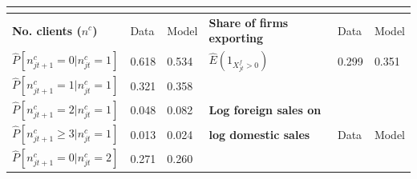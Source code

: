 \bigskip

\begin{table}
    \centering
    {\small 
    \begin{tabular}{llllll}
        \multicolumn{6}{c}{} \\ \hline\hline
        \textbf{No. clients (}$n^{c}$\textbf{)}\footnotemark[0]                                       & {Data}                                         &
        {Model}                                                                       & \textbf{Share of firms exporting}              &
        {Data}                                                                        & {Model} \\ \hline
        $\widehat{P}[n_{jt+1}^{c}=0|n_{jt}^{c}=1]$                                    & {0.618}                                        &
        {0.534}                                                                       & $\widehat{E}(1_{X_{jt}^{f}>0})$                &
        {0.299}                                                                       & {0.351} \\
        $\widehat{P}[n_{jt+1}^{c}=1|n_{jt}^{c}=1]$                                    & {0.321}                                        &
        {0.358}                                                                       &                                                & {}            & {}
        \\
        $\widehat{P}[n_{jt+1}^{c}=2|n_{jt}^{c}=1]$                                    & {0.048}                                        &
        {0.082}                                                                       & \textbf{Log foreign sales on}                  &
        {}                                                                            & {} \\
        $\widehat{P}[n_{jt+1}^{c}\geq 3|n_{jt}^{c}=1]$                                & {0.013}                                        &
        {0.024}                                                                       & \textbf{log domestic sales}                    & {
        Data}                                                                         & {Model} \\ \cline{4-6}
        $\widehat{P}[n_{jt+1}^{c}=0|n_{jt}^{c}=2]$                                    & {0.271}                                        &
        {0.260}                                                                       &                                                & {}            & {}

\end{tabular}}
\end{table}
